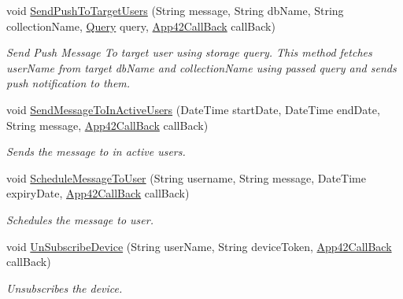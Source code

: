 \begin{DoxyCompactItemize}
void \hyperlink{classcom_1_1shephertz_1_1app42_1_1paas_1_1sdk_1_1csharp_1_1push_notification_1_1_push_notification_service_a390915a649b3772d009f7b09f0feb789}{Send\+Push\+To\+Target\+Users} (String message, String db\+Name, String collection\+Name, \hyperlink{classcom_1_1shephertz_1_1app42_1_1paas_1_1sdk_1_1csharp_1_1storage_1_1_query}{Query} query, \hyperlink{interfacecom_1_1shephertz_1_1app42_1_1paas_1_1sdk_1_1csharp_1_1_app42_call_back}{App42\+Call\+Back} call\+Back)
\begin{DoxyCompactList}\small\item\em Send Push Message To target user using storage query. This method fetches user\+Name from target db\+Name and collection\+Name using passed query and sends push notification to them. \end{DoxyCompactList}\item 
void \hyperlink{classcom_1_1shephertz_1_1app42_1_1paas_1_1sdk_1_1csharp_1_1push_notification_1_1_push_notification_service_ae8b5487f00f77d31a472a34632bf8850}{Send\+Message\+To\+In\+Active\+Users} (Date\+Time start\+Date, Date\+Time end\+Date, String message, \hyperlink{interfacecom_1_1shephertz_1_1app42_1_1paas_1_1sdk_1_1csharp_1_1_app42_call_back}{App42\+Call\+Back} call\+Back)
\begin{DoxyCompactList}\small\item\em Sends the message to in active users. \end{DoxyCompactList}\item 
void \hyperlink{classcom_1_1shephertz_1_1app42_1_1paas_1_1sdk_1_1csharp_1_1push_notification_1_1_push_notification_service_ad75505c06e0aa28a06bb6e9d0e34c830}{Schedule\+Message\+To\+User} (String username, String message, Date\+Time expiry\+Date, \hyperlink{interfacecom_1_1shephertz_1_1app42_1_1paas_1_1sdk_1_1csharp_1_1_app42_call_back}{App42\+Call\+Back} call\+Back)
\begin{DoxyCompactList}\small\item\em Schedules the message to user. \end{DoxyCompactList}\item 
void \hyperlink{classcom_1_1shephertz_1_1app42_1_1paas_1_1sdk_1_1csharp_1_1push_notification_1_1_push_notification_service_a0fd7f26f061810dc063014fc819186d7}{Un\+Subscribe\+Device} (String user\+Name, String device\+Token, \hyperlink{interfacecom_1_1shephertz_1_1app42_1_1paas_1_1sdk_1_1csharp_1_1_app42_call_back}{App42\+Call\+Back} call\+Back)
\begin{DoxyCompactList}\small\item\em Unsubscribes the device. \end{DoxyCompactList}\item 

\end{DoxyCompactItemize}
